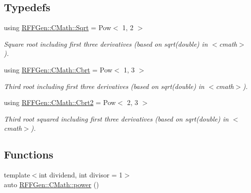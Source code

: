 \subsection*{Typedefs}
\begin{DoxyCompactItemize}
\item 
\hypertarget{group__CMathGroup_ga1df0427b70721cce09aabcb0b12cdde5}{using \hyperlink{group__CMathGroup_ga1df0427b70721cce09aabcb0b12cdde5}{R\-F\-F\-Gen\-::\-C\-Math\-::\-Sqrt} = Pow$<$ 1, 2 $>$}\label{group__CMathGroup_ga1df0427b70721cce09aabcb0b12cdde5}

\begin{DoxyCompactList}\small\item\em Square root including first three derivatives (based on sqrt(double) in $<$cmath$>$). \end{DoxyCompactList}\item 
\hypertarget{group__CMathGroup_gaadddd06c274ebfff6e54908a36c0d98f}{using \hyperlink{group__CMathGroup_gaadddd06c274ebfff6e54908a36c0d98f}{R\-F\-F\-Gen\-::\-C\-Math\-::\-Cbrt} = Pow$<$ 1, 3 $>$}\label{group__CMathGroup_gaadddd06c274ebfff6e54908a36c0d98f}

\begin{DoxyCompactList}\small\item\em Third root including first three derivatives (based on sqrt(double) in $<$cmath$>$). \end{DoxyCompactList}\item 
\hypertarget{group__CMathGroup_gae78a14bfd1a9ab12eed3309d102c2538}{using \hyperlink{group__CMathGroup_gae78a14bfd1a9ab12eed3309d102c2538}{R\-F\-F\-Gen\-::\-C\-Math\-::\-Cbrt2} = Pow$<$ 2, 3 $>$}\label{group__CMathGroup_gae78a14bfd1a9ab12eed3309d102c2538}

\begin{DoxyCompactList}\small\item\em Third root squared including first three derivatives (based on sqrt(double) in $<$cmath$>$). \end{DoxyCompactList}\end{DoxyCompactItemize}
\subsection*{Functions}
\begin{DoxyCompactItemize}
\item 
{\footnotesize template$<$int dividend, int divisor = 1$>$ }\\auto \hyperlink{group__CMathGroup_gaad5ee8ed4c0e87842e3ec66b54cf25e0}{R\-F\-F\-Gen\-::\-C\-Math\-::power} ()
\end{DoxyCompactItemize}


